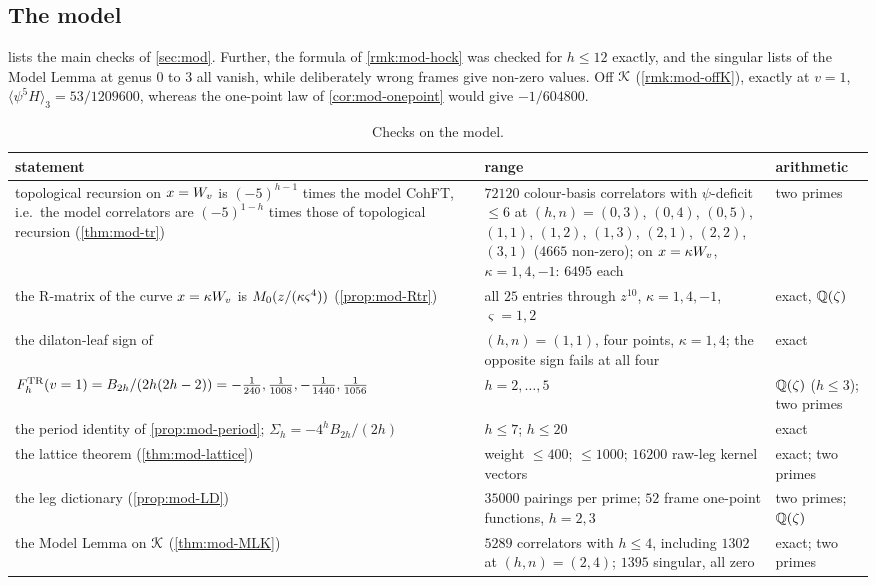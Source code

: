 
\subsection{The model}
\label{sec:evi-model}

 lists the main checks of \cref{sec:mod}. Further, the formula of \cref{rmk:mod-hock} was checked for $h\leq 12$ exactly, and the singular lists of the Model Lemma at genus $0$ to $3$ all vanish, while deliberately wrong frames give non-zero values. Off $\mathcal{K}$ (\cref{rmk:mod-offK}), exactly at $v=1$, $\langle\psi^5H\rangle_3=53/1209600$, whereas the one-point law of \cref{cor:mod-onepoint} would give $-1/604800$.

\begin{table}[ht]
\centering\small
\begin{tabular}{>{\raggedright\arraybackslash}p{}|>{\raggedright\arraybackslash}p{}|>{\raggedright\arraybackslash}p{}}
statement & range & arithmetic\\ \hline
topological recursion on $x=W_{v}$ is $(-5)^{h-1}$ times the model CohFT, i.e.\ the model correlators are $(-5)^{1-h}$ times those of topological recursion (\cref{thm:mod-tr}) & $72120$ colour-basis correlators with $\psi$-deficit $\leq 6$ at $(h,n)=(0,3)$, $(0,4)$, $(0,5)$, $(1,1)$, $(1,2)$, $(1,3)$, $(2,1)$, $(2,2)$, $(3,1)$ ($4665$ non-zero); on $x=\kappa W_{v}$, $\kappa=1,4,-1$: $6495$ each & two primes\\
the R-matrix of the curve $x=\kappa W_{v}$ is $M_{0}(z/(\kappa\varsigma^4))$ (\cref{prop:mod-Rtr}) & all $25$ entries through $z^{10}$, $\kappa=1,4,-1$, $\varsigma=1,2$ & exact, $\mathbb{Q}(\zeta)$\\
the dilaton-leaf sign of \cite[Def.~2.13]{PPZ15} & $(h,n)=(1,1)$, four points, $\kappa=1,4$; the opposite sign fails at all four & exact\\
$F^{\mathrm{TR}}_h(v=1)=B_{2h}/(2h(2h-2))=-\tfrac{1}{240},\tfrac{1}{1008},-\tfrac{1}{1440},\tfrac{1}{1056}$ & $h=2,\dots,5$ & $\mathbb{Q}(\zeta)$ ($h\leq 3$); two primes\\
the period identity of \cref{prop:mod-period}; $\Sigma_h=-4^hB_{2h}/(2h)$ & $h\leq 7$; $h\leq 20$ & exact\\
the lattice theorem (\cref{thm:mod-lattice}) & weight $\leq 400$; $\leq 1000$; $16200$ raw-leg kernel vectors & exact; two primes\\
the leg dictionary (\cref{prop:mod-LD}) & $35000$ pairings per prime; $52$ frame one-point functions, $h=2,3$ & two primes; $\mathbb{Q}(\zeta)$\\
the Model Lemma on $\mathcal{K}$ (\cref{thm:mod-MLK}) & $5289$ correlators with $h\leq 4$, including $1302$ at $(h,n)=(2,4)$; $1395$ singular, all zero & exact; two primes\\
\end{tabular}
\caption{Checks on the model.}
\label{tab:evi-model}
\end{table}
